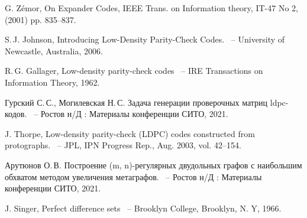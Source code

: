\documentclass[14pt]{mmcs-article}
\begin{document}
\begin{thebibliography}{0}

G. Zémor, On Expander Codes, IEEE Trans. on Information theory, IT-47
No 2, (2001) pp. 835–837.
  
S.\,J. Johnson,
Introducing Low-Density Parity-Check Codes.
~-- University of Newcastle, Australia, 2006.

R.\,G. Gallager,
Low-density parity-check codes
~-- IRE Transactions on Information Theory, 1962.

Гурский С.\,С., Могилевская Н.\,С.
Задача генерации проверочных матриц ldpc-кодов.
~-- Ростов н/Д : Материалы конференции СИТО, 2021.

J. Thorpe,
Low-density parity-check (LDPC) codes constructed from protographs.
~-- JPL, IPN Progress Rep., Aug. 2003, vol. 42–154.

Арутюнов О.\,В.
Построение (m, n)-регулярных двудольных графов с наибольшим обхватом методом увеличения метаграфов.
~-- Ростов н/Д : Материалы конференции СИТО, 2021.

J. Singer,
Perfect difference sets
~-- Brooklyn College, Brooklyn, N. Y, 1966.

\end{thebibliography}
\end{document}
